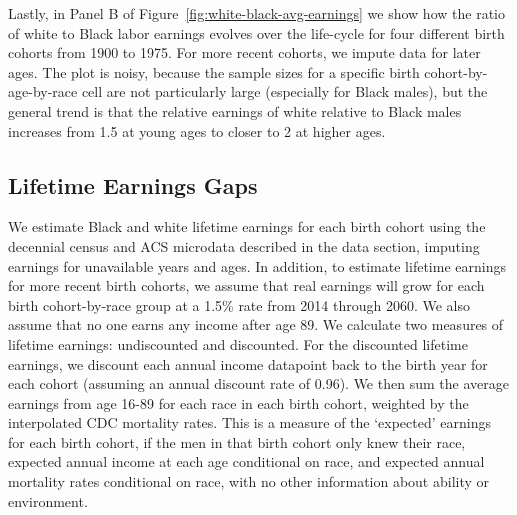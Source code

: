 \documentclass[12pt]{article}
\begin{document}
Lastly, in Panel B of Figure~\ref{fig:white-black-avg-earnings} we show how the ratio of white to Black labor earnings evolves over the life-cycle for four different birth cohorts from 1900 to 1975. 
For more recent cohorts, we impute data for later ages. 
The plot is noisy, because the sample sizes for a specific birth cohort-by-age-by-race cell are not particularly large (especially for Black males), but the general trend is that the relative earnings of white relative to Black males increases from 1.5 at young ages to closer to 2 at higher ages.

\subsection{Lifetime Earnings Gaps\label{sec:results-lifetime}}

We estimate Black and white lifetime earnings for each birth cohort using the decennial census and ACS microdata described in the data section, imputing earnings for unavailable years and ages. 
In addition, to estimate lifetime earnings for more recent birth cohorts, we assume that real earnings will grow for each birth cohort-by-race group at a 1.5\% rate from 2014 through 2060. 
We also assume that no one earns any income after age 89. 
We calculate two measures of lifetime earnings: undiscounted and discounted. 
For the discounted lifetime earnings, we discount each annual income datapoint back to the birth year for each cohort (assuming an annual discount rate of 0.96). 
We then sum the average earnings from age 16-89 for each race in each birth cohort, weighted by the interpolated CDC mortality rates. 
This is a measure of the `expected' earnings for each birth cohort, if the men in that birth cohort only knew their race, expected annual income at each age conditional on race, and expected annual mortality rates conditional on race, with no other information about ability or environment.
\end{document}
